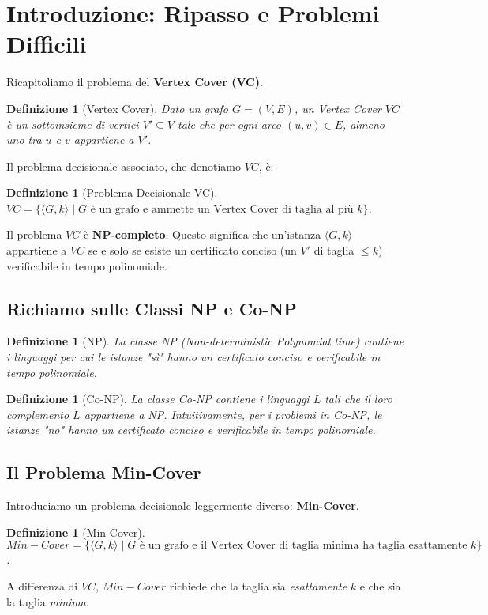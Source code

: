 \documentclass[a4paper, 11pt]{book} %
\newtheorem{definition}[theorem]{Definizione}
\theoremstyle{definition}
\begin{document}
\section{Introduzione: Ripasso e Problemi Difficili}

Ricapitoliamo il problema del \textbf{Vertex Cover (VC)}.
\begin{definition}[Vertex Cover]
Dato un grafo $G=(V,E)$, un Vertex Cover $VC$ è un sottoinsieme di vertici $V' \subseteq V$ tale che per ogni arco $(u,v) \in E$, almeno uno tra $u$ e $v$ appartiene a $V'$.
\end{definition}

Il problema decisionale associato, che denotiamo $VC$, è:
\begin{definition}[Problema Decisionale VC]
$VC = \{ \langle G, k \rangle \mid G \text{ è un grafo e ammette un Vertex Cover di taglia al più } k \}$.
\end{definition}
Il problema $VC$ è \textbf{NP-completo}. Questo significa che un'istanza $\langle G,k \rangle$ appartiene a $VC$ se e solo se esiste un certificato conciso (un $V'$ di taglia $\le k$) verificabile in tempo polinomiale.

\subsection{Richiamo sulle Classi NP e Co-NP}
\begin{definition}[NP]
La classe NP (Non-deterministic Polynomial time) contiene i linguaggi per cui le istanze "sì" hanno un certificato conciso e verificabile in tempo polinomiale.
\end{definition}
\begin{definition}[Co-NP]
La classe Co-NP contiene i linguaggi $L$ tali che il loro complemento $\overline{L}$ appartiene a NP. Intuitivamente, per i problemi in Co-NP, le istanze "no" hanno un certificato conciso e verificabile in tempo polinomiale.
\end{definition}

\subsection{Il Problema Min-Cover}
Introduciamo un problema decisionale leggermente diverso: \textbf{Min-Cover}.
\begin{definition}[Min-Cover]
$Min-Cover = \{ \langle G, k \rangle \mid G \text{ è un grafo e il Vertex Cover di taglia minima ha taglia esattamente } k \}$.
\end{definition}
A differenza di $VC$, $Min-Cover$ richiede che la taglia sia \emph{esattamente} $k$ e che sia la taglia \emph{minima}.
\end{document}
